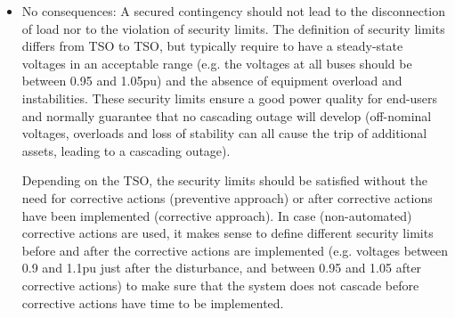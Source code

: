 \begin{itemize}
    \item No consequences: A secured contingency should not lead to the disconnection of load nor to the violation of security limits. The definition of security limits differs from TSO to TSO, but typically require to have a steady-state voltages in an acceptable range (e.g. the voltages at all buses should be between 0.95 and 1.05pu) and the absence of equipment overload and instabilities. These security limits ensure a good power quality for end-users and normally guarantee that no cascading outage will develop (off-nominal voltages, overloads and loss of stability can all cause the trip of additional assets, leading to a cascading outage).

    Depending on the TSO, the security limits should be satisfied without the need for corrective actions (preventive approach) or after corrective actions have been implemented (corrective approach). In case (non-automated) corrective actions are used, it makes sense to define different security limits before and after the corrective actions are implemented (e.g. voltages between 0.9 and 1.1pu just after the disturbance, and between 0.95 and 1.05 after corrective actions) to make sure that the system does not cascade before corrective actions have time to be implemented.


\end{itemize}

